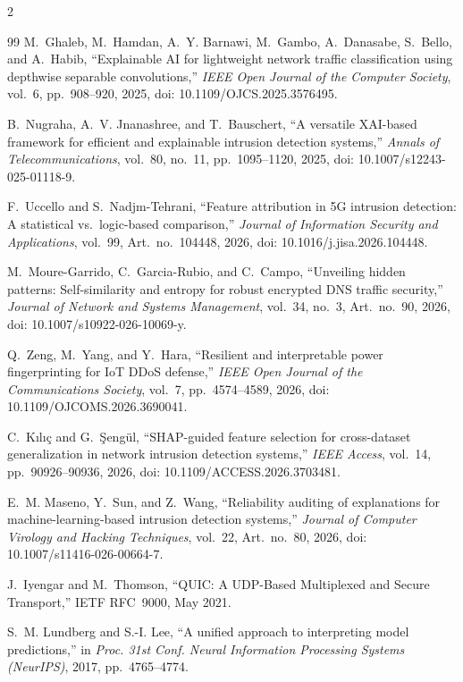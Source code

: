 \begin{multicols}{2}
\begin{thebibliography}{99}
M.~Ghaleb, M.~Hamdan, A.~Y. Barnawi, M.~Gambo, A.~Danasabe, S.~Bello, and A.~Habib, ``Explainable AI for lightweight network traffic classification using depthwise separable convolutions,'' \textit{IEEE Open Journal of the Computer Society}, vol.~6, pp.~908--920, 2025, doi: 10.1109/OJCS.2025.3576495.

B.~Nugraha, A.~V. Jnanashree, and T.~Bauschert, ``A versatile XAI-based framework for efficient and explainable intrusion detection systems,'' \textit{Annals of Telecommunications}, vol.~80, no.~11, pp.~1095--1120, 2025, doi: 10.1007/s12243-025-01118-9.

F.~Uccello and S.~Nadjm-Tehrani, ``Feature attribution in 5G intrusion detection: A statistical vs.\ logic-based comparison,'' \textit{Journal of Information Security and Applications}, vol.~99, Art.~no.~104448, 2026, doi: 10.1016/j.jisa.2026.104448.

M.~Moure-Garrido, C.~Garcia-Rubio, and C.~Campo, ``Unveiling hidden patterns: Self-similarity and entropy for robust encrypted DNS traffic security,'' \textit{Journal of Network and Systems Management}, vol.~34, no.~3, Art.~no.~90, 2026, doi: 10.1007/s10922-026-10069-y.

Q.~Zeng, M.~Yang, and Y.~Hara, ``Resilient and interpretable power fingerprinting for IoT DDoS defense,'' \textit{IEEE Open Journal of the Communications Society}, vol.~7, pp.~4574--4589, 2026, doi: 10.1109/OJCOMS.2026.3690041.

C.~K{\i}l{\i}\c{c} and G.~\c{S}eng\"{u}l, ``SHAP-guided feature selection for cross-dataset generalization in network intrusion detection systems,'' \textit{IEEE Access}, vol.~14, pp.~90926--90936, 2026, doi: 10.1109/ACCESS.2026.3703481.

E.~M. Maseno, Y.~Sun, and Z.~Wang, ``Reliability auditing of explanations for machine-learning-based intrusion detection systems,'' \textit{Journal of Computer Virology and Hacking Techniques}, vol.~22, Art.~no.~80, 2026, doi: 10.1007/s11416-026-00664-7.

J.~Iyengar and M.~Thomson, ``QUIC: A UDP-Based Multiplexed and Secure Transport,'' IETF RFC~9000, May 2021.

S.~M. Lundberg and S.-I. Lee, ``A unified approach to interpreting model predictions,'' in \textit{Proc. 31st Conf. Neural Information Processing Systems (NeurIPS)}, 2017, pp.~4765--4774.


\end{thebibliography}
\end{multicols}

